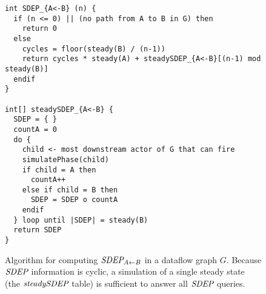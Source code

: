 \begin{figure}[t]
{\scriptsize
\begin{verbatim}
int SDEP_{A<-B} (n) {
  if (n <= 0) || (no path from A to B in G) then
    return 0
  else
    cycles = floor(steady(B) / (n-1))
    return cycles * steady(A) + steadySDEP_{A<-B}[(n-1) mod steady(B)]
  endif
}

int[] steadySDEP_{A<-B} {
  SDEP = { }
  countA = 0
  do {
    child <- most downstream actor of G that can fire
    simulatePhase(child)
    if child = A then
      countA++
    else if child = B then
      SDEP = SDEP o countA
    endif
  } loop until |SDEP| = steady(B)
  return SDEP
}
\end{verbatim}}
\vspace{-12pt}
\caption{\small Algorithm for computing $\figsdepf{A}{B}$ in a
dataflow graph $G$.  Because $\mbox{\it SDEP}$ information is cyclic, a
simulation of a single steady state (the $\mbox{\it steadySDEP}$ table) is
sufficient to answer all $\mbox{\it SDEP}$
queries. \protect\label{fig:sdep1}}
\end{figure}



